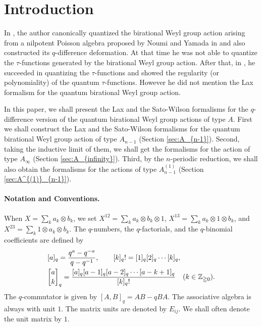 \documentclass[12pt,twoside]{article}
\newcommand\ot{\otimes}
\newcommand\Z{{\mathbb Z}} %
\theoremstyle{plain} %
\theoremstyle{definition} %
\theoremstyle{definition} %
\numberwithin{theorem}{section}
\numberwithin{equation}{section}
\numberwithin{figure}{section}
\numberwithin{table}{section}
\newcommand\secref[1]{Section \ref{#1}}
\begin{document}
\title{\TITLE}
\author{\AUTHOR}
\date{\DATE}
\maketitle
\begin{abstract}
  \ABSTRACT
\end{abstract}
\tableofcontents
\setcounter{section}{-1} %

\section{Introduction}

In \cite{Kuroki2008}, 
the author canonically quantized 
the birational Weyl group action 
arising from a nilpotent Poisson algebra 
proposed by Noumi and Yamada in \cite{NY0012028}
and also constructed its $q$-difference deformation. 
At that time he was not able to quantize the $\tau$-functions 
generated by the birational Weyl group action.
After that, in \cite{Kuroki2012a}, he succeeded 
in quantizing the $\tau$-functions
and showed the regularity (or polynomiality) 
of the quantum $\tau$-functions.
However he did not mention the Lax formalism 
for the quantum birational Weyl group action.  

In this paper, we shall present the Lax and the Sato-Wilson formalisms
for the $q$-difference version of the quantum birational Weyl group actions
of type $A$.  
First we shall construct the Lax and the Sato-Wilson formalisms 
for the quantum birational Weyl group action of type $A_{n-1}$ 
(\secref{sec:A_{n-1}}).
Second, taking the inductive limit of them,
we shall get the formalisms for the action of type $A_\infty$
(\secref{sec:A_{infinity}}).  
Third, by the $n$-periodic reduction, we shall also obtain the formalisms 
for the actions of type $A^{(1)}_{n-1}$
(\secref{sec:A^{(1)}_{n-1}}).

\paragraph{Notation and Conventions.}
When $X = \sum_k a_k\ot b_k$, we set 
$X^{12}=\sum_k a_k\ot b_k\ot 1$, 
$X^{13}=\sum_k a_k\ot 1\ot b_k$, and
$X^{23}=\sum_k 1\ot a_k\ot b_k$.
The $q$-numbers, the $q$-factorials, and the $q$-binomial coefficients are defined by
\begin{align*}
 &
 [a]_q = \frac{q^a-q^{-a}}{q-q^{-1}}, \qquad
 [k]_q! = [1]_q[2]_q\cdots[k]_q, \quad
 \\ &
 \qbinom{a}{k}_q =
 \frac{[a]_q[a-1]_q[a-2]_q\cdots[a-k+1]_q}{[k]_q!}
 \quad  (k\in\Z_{\geqq0}).
\end{align*}
The $q$-commutator is given by $[A,B]_q=AB-qBA$.
The associative algebra is always with unit $1$. 
The matrix units are denoted by $E_{ij}$.
We shall often denote the unit matrix by $1$.
\end{document}
